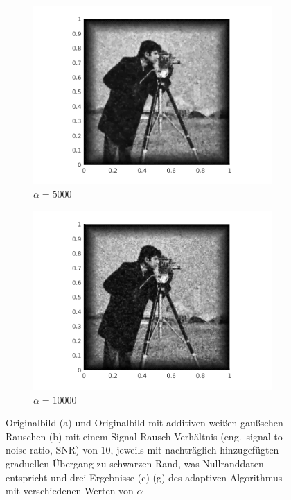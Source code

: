\begin{figure}[h]
  \begin{subfigure}{.3\linewidth}
    \includegraphics[trim = 60 0 60 20, clip, width=\linewidth]
      {pictures/introBeta/snr10/05000.png}
    \caption{$\alpha=5000$}
    \label{fig:snr10alpha5000}
  \end{subfigure}
  \begin{subfigure}{.3\linewidth}
    \includegraphics[trim = 60 0 60 20, clip, width=\linewidth]
      {pictures/introBeta/snr10/10000.png}
    \caption{$\alpha=10000$}
    \label{fig:snr10alpha10000}
  \end{subfigure}
  \caption{Originalbild (a) und Originalbild mit additiven weißen gaußschen
  Rauschen (b) mit einem Signal-Rausch-Verhältnis (eng.\ signal-to-noise
  ratio, SNR) von 10, jeweils mit nachträglich hinzugefügten graduellen
  Übergang zu schwarzen Rand, was Nullranddaten entspricht und drei Ergebnisse
  (c)-(g) des adaptiven Algorithmus mit verschiedenen Werten von $\alpha$}
  \label{fig:exampleDenoising}
\end{figure}

